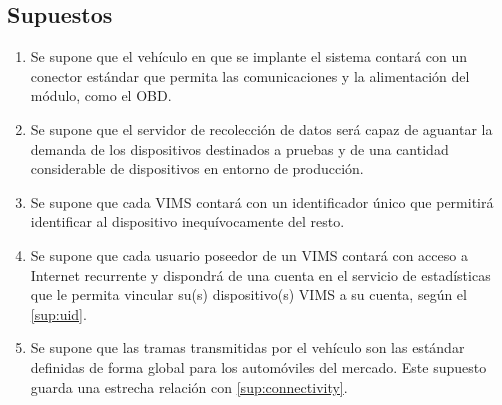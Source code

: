 \subsection*{Supuestos}
\begin{enumerate}[label=\textbf{\texttt{SUP-\arabic*}}]
  \item\label{sup:connectivity} Se supone que el vehículo en que se implante el sistema contará con un
        conector estándar que permita las comunicaciones y la alimentación del módulo,
        como el \ac{OBD}.
  \item\label{sup:server} Se supone que el servidor de recolección de datos será
        capaz de aguantar la demanda de los dispositivos destinados a pruebas y de
        una cantidad considerable de dispositivos en entorno de producción.
  \item\label{sup:uid} Se supone que cada \ac{VIMS} contará con un identificador
        único que permitirá identificar al dispositivo inequívocamente del resto.
  \item\label{sup:users} Se supone que cada usuario poseedor de un \ac{VIMS} contará
        con acceso a Internet recurrente y dispondrá de una cuenta en el servicio de
        estadísticas que le permita vincular su(s) dispositivo(s) \ac{VIMS} a su
        cuenta, según el \ref{sup:uid}.
  \item\label{sup:pids} Se supone que las tramas transmitidas por el vehículo
        son las estándar definidas de forma global para los automóviles del mercado.
        Este supuesto guarda una estrecha relación con \ref{sup:connectivity}.
\end{enumerate}
